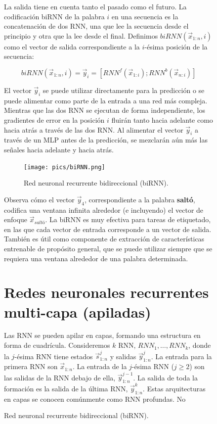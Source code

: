 \documentclass{book}
\begin{document}
\begin{figure}[h]
{La salida tiene en cuenta tanto el pasado como el futuro. La codificación biRNN de la palabra $i$ en una secuencia es la concatenación de dos RNN, una que lee la secuencia desde el principio y otra que la lee desde el final. Definimos $biRNN(\vec{x}_{1:n}, i)$ como el vector de salida correspondiente a la $i$-ésima posición de la secuencia:

\begin{displaymath}
biRNN(\vec{x}_{1:n}, i) = \vec{y}_i = [RNN^{f}(\vec{x}_{1:i});RNN^{b}(\vec{x}_{n:i})]
\end{displaymath}

El vector $\vec{y}_i$ se puede utilizar directamente para la predicción o se puede alimentar como parte de la entrada a una red más compleja. Mientras que las dos RNN se ejecutan de forma independiente, los gradientes de error en la posición $i$ fluirán tanto hacia adelante como hacia atrás a través de las dos RNN. Al alimentar el vector $\vec{y}_i$ a través de un MLP antes de la predicción, se mezclarán aún más las señales hacia adelante y hacia atrás.

\begin{figure}[h]
  \centering
  \texttt{[image: pics/biRNN.png]}
  \caption{Red neuronal recurrente bidireccional (biRNN).}
\end{figure}

Observa cómo el vector $\vec{y}_4$, correspondiente a la palabra \textbf{saltó}, codifica una ventana infinita alrededor (e incluyendo) el vector de enfoque $\vec{x}_{saltó}$. La biRNN es muy efectiva para tareas de etiquetado, en las que cada vector de entrada corresponde a un vector de salida. También es útil como componente de extracción de características entrenable de propósito general, que se puede utilizar siempre que se requiera una ventana alrededor de una palabra determinada.

\section{Redes neuronales recurrentes multi-capa (apiladas)}

Las RNN se pueden apilar en capas, formando una estructura en forma de cuadrícula. Consideremos $k$ RNN, $RNN_{1},\dots, RNN_{k}$, donde la $j$-ésima RNN tiene estados $\vec{s}_{1:n}^{j}$ y salidas $\vec{y}_{1:n}^{j}$. La entrada para la primera RNN son $\vec{x}_{1:n}$. La entrada de la $j$-ésima RNN ($j\geq 2$) son las salidas de la RNN debajo de ella, $\vec{y}_{1:n}^{j-1}$. La salida de toda la formación es la salida de la última RNN, $\vec{y}_{1:n}^k$. Estas arquitecturas en capas se conocen comúnmente como RNN profundas. No

}
\end{figure}
\end{document}
